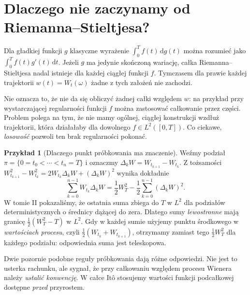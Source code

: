 \documentclass[11pt,a4paper,oneside]{report}
\numberwithin{equation}{chapter}
\theoremstyle{plain}
\theoremstyle{definition}
\newtheorem{przyklad}{Przykład}[chapter]
\theoremstyle{remark}
\newcommand{\dd}{\mathrm{d}}
\begin{document}
\label{ch:wiener-integral}
\section{Dlaczego nie zaczynamy od Riemanna--Stieltjesa?}\label{sec:volIII:01:01}
Dla gładkiej funkcji $g$ klasyczne wyrażenie
$\int_0^T f(t)\,\dd g(t)$ można rozumieć jako
$\int_0^T f(t)g'(t)\,\dd t$. Jeżeli $g$ ma jedynie
skończoną wariację, całka Riemanna--Stieltjesa nadal istnieje
dla każdej ciągłej funkcji $f$. Tymczasem dla prawie każdej
trajektorii $w(t)=W_t(\omega)$ żadne z tych założeń nie zachodzi.

Nie oznacza to, że nie da się obliczyć żadnej całki względem $w$:
na przykład przy wystarczającej regularności funkcji $f$ można
zastosować całkowanie przez części. Problem polega na tym,
że nie mamy ogólnej, ciągłej konstrukcji wzdłuż trajektorii,
która działałaby dla dowolnego $f\in L^2([0,T])$.
Co ciekawe, \emph{losowość} pozwoli ten brak regularności pokonać.

\begin{przyklad}[Dlaczego punkt próbkowania ma znaczenie]
Weźmy podział $\pi=\{0=t_0<\cdots<t_n=T\}$ i oznaczmy
$\Delta_kW=W_{t_{k+1}}-W_{t_k}$. Z tożsamości
$W_{t_{k+1}}^2-W_{t_k}^2=2W_{t_k}\Delta_kW+(\Delta_kW)^2$
wynika dokładnie
\[
\sum_{k=0}^{n-1}W_{t_k}\Delta_kW
=\frac12W_T^2-\frac12\sum_{k=0}^{n-1}(\Delta_kW)^2.
\]
W tomie II pokazaliśmy, że ostatnia suma zbiega do $T$ w $L^2$
dla podziałów deterministycznych o średnicy dążącej do zera.
Dlatego sumy \emph{lewostronne} mają granicę
$\frac12(W_T^2-T)$ w $L^2$. Gdy w każdej sumie użyjemy
punktu środkowego w \emph{wartościach procesu}, czyli
$\frac12(W_{t_k}+W_{t_{k+1}})$, otrzymamy zamiast tego
$\frac12W_T^2$ dla każdego podziału: odpowiednia suma
jest teleskopowa.

Dwie pozornie podobne reguły próbkowania dają różne odpowiedzi.
Nie jest to usterka rachunku, ale sygnał, że przy całkowaniu względem
procesu Wienera należy \emph{ustalić konwencję}. W całce Itô
stosujemy wartości funkcji podcałkowej dostępne \emph{przed} przyrostem.
\end{przyklad}
\end{document}
